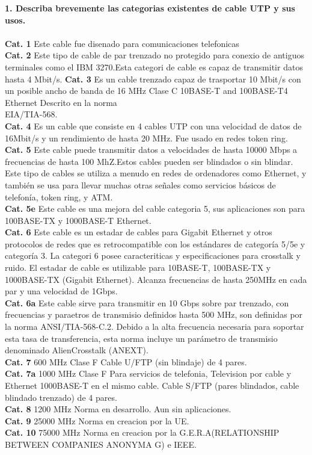 \documentclass[onecolumn,12pt]{IEEEtran}
\begin{document}
\textbf{1. Describa brevemente las categorias existentes de cable UTP y sus usos.}\\
\hfill \\
\textbf{Cat. 1} Este cable fue disenado para comunicaciones telefonicas \\
\textbf{Cat. 2}	Este tipo de cable de par trenzado no protegido para conexio de antiguos terminales como el IBM 3270.Esta categori de cable es capaz de transmitir datos hasta 4 Mbit/s.
\textbf{Cat. 3}	Es un cable trenzado capaz de trasportar 10 Mbit/s con un posible ancho de banda de 16 MHz
Clase C	10BASE-T and 100BASE-T4 Ethernet	Descrito en la norma \\EIA/TIA-568.\\   
\textbf{Cat. 4}	Es un cable que consiste en 4 cables UTP con una velocidad de datos de 16Mbit/s y un rendimiento de hasta 20 MHz. Fue usado en redes token ring.\\
\textbf{Cat. 5}	Este cable puede transmitir datos a velocidades de hasta 10000 Mbps a frecuencias de hasta 100 MhZ.Estos cables pueden ser blindados o sin blindar. Este tipo de cables se utiliza a menudo en redes de ordenadores como Ethernet, y también se usa para llevar muchas otras señales como servicios básicos de telefonía, token ring, y ATM.\\
\textbf{Cat. 5e} Este cable es una mejora del cable categoria 5, sus aplicaciones son para 100BASE-TX y 1000BASE-T Ethernet.\\
\textbf{Cat. 6}	Este cable es un estadar de cables para Gigabit Ethernet y otros protocolos de redes que es retrocompatible con los estándares de categoría 5/5e y categoría 3. La categori 6 posee caracteriticas y especificaciones para crosstalk y ruido. El estadar de cable es utilizable para 10BASE-T, 100BASE-TX y 1000BASE-TX (Gigabit Ethernet). Alcanza frecuencias de hasta 250MHz en cada par y una velocidad de 1Gbps.\\
\textbf{Cat. 6a} Este cable sirve para transmitir en 10 Gbps sobre par trenzado, con frecuencias y paraetros de transmisio definidos hasta 500 MHz, son definidas por la norma ANSI/TIA-568-C.2. Debido a la alta frecuencia necesaria para soportar esta tasa de transferencia, esta norma incluye un parámetro de transmisio denominado AlienCrosstalk (ANEXT).\\
\textbf{Cat. 7}	600 MHz Clase F		Cable U/FTP (sin blindaje) de 4 pares. \\
\textbf{Cat. 7a}	1000 MHz Clase F	Para servicios de telefonia, Television por cable y Ethernet 1000BASE-T en el mismo cable.	Cable S/FTP (pares blindados, cable blindado trenzado) de 4 pares. \\
\textbf{Cat. 8}	1200 MHz	Norma en desarrollo. Aun sin aplicaciones. \\
\textbf{Cat. 9}	25000 MHz	Norma en creacion por la UE. \\
\textbf{Cat. 10}	75000 MHz	Norma en creacion por la G.E.R.A(RELATIONSHIP BETWEEN COMPANIES ANONYMA G) e IEEE.\\
\hfill \\
\end{document}
